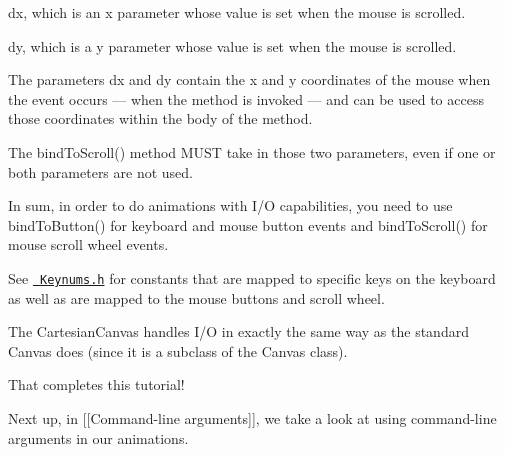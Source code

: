 \begin{DoxyItemize}
\item dx, which is an x parameter whose value is set when the mouse is scrolled.
\item dy, which is a y parameter whose value is set when the mouse is scrolled.
\end{DoxyItemize}

The parameters dx and dy contain the x and y coordinates of the mouse when the event occurs — when the method is invoked — and can be used to access those coordinates within the body of the method.

The {\ttfamily bind\+To\+Scroll()} method M\+U\+ST take in those two parameters, even if one or both parameters are not used.

In sum, in order to do animations with I/O capabilities, you need to use {\ttfamily bind\+To\+Button()} for keyboard and mouse button events and {\ttfamily bind\+To\+Scroll()} for mouse scroll wheel events.

See \href{http://calvin-cs.github.io/TSGL/html/_keynums_8h_source.html}{\texttt{ Keynums.\+h}} for constants that are mapped to specific keys on the keyboard as well as are mapped to the mouse buttons and scroll wheel.

The Cartesian\+Canvas handles I/O in exactly the same way as the standard Canvas does (since it is a subclass of the Canvas class).

That completes this tutorial!

Next up, in \mbox{[}\mbox{[}Command-\/line arguments\mbox{]}\mbox{]}, we take a look at using command-\/line arguments in our animations. 